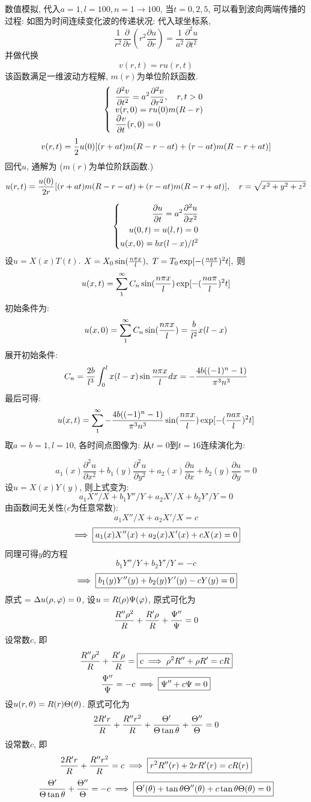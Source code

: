 \documentclass[UTF8,9pt]{ctexart}
\begin{document}
数值模拟, 代入$a=1, l=100, n=1\rightarrow100$, 当$t=0,2,5$, 可以看到波向两端传播的过程:
如图为时间连续变化波的传递状况:
\newpage
{}
代入球坐标系, 
$$ 
\frac{1}{r^{2}} \frac{\partial}{\partial r}(r^{2} \frac{\partial u}{\partial r})=\frac{1}{a^{2}} \frac{\partial^{2} u}{\partial t^{2}}
 $$
 并做代换
 $$ 
v(r, t)=r u(r, t)
 $$
该函数满足一维波动方程解, $m(r)$为单位阶跃函数. 
$$ 
\left\{\begin{array}{l}
{\displaystyle\frac{\partial^{2} v}{\partial t^{2}}=a^{2} \frac{\partial^{2} v}{\partial r^{2}}, \quad r, t>0} \\ 
{v(r, 0)=ru(0)m(R-r)} \\ 
{\displaystyle \frac{\partial^{} v}{\partial t^{}}(r,0)=0}
\end{array}\right.
 $$
$$v(r,t) = \frac{1}{2}u(0)[(r+at)m(R-r-at)+(r-at)m(R-r+at)]$$
回代$u$, 通解为 ($m(r)$为单位阶跃函数.)
$$ 
u(r,t) = \frac{u(0)}{2r}[(r+at)m(R-r-at)+(r-at)m(R-r+at)],\quad r=\sqrt{x^2+y^2+z^2}
 $$



 \newpage
{}
$$\left\{\begin{aligned}  
    \displaystyle\frac{\partial u}{\partial t}=a^{2} \frac{\partial^{2} u}{\partial x^{2}}\\
    u(0,t) = u(l,t) = 0\\
    u(x,0) = bx(l-x)/l^2\\
 \end{aligned}\right.$$
设$u=X(x)T(t)$. $X=X_0\sin(\f{n\pi x}{l}),\ T=T_0\exp[-(\f{na\pi}{l})^2t],\ $则
$$ u(x,t) = \sum_1^{\infty} C_n \sin(\frac{n\pi x}{l})\exp[-(\frac{na\pi}{l})^2t]$$ 
初始条件为: 
$$u(x,0) = \sum_1^{\infty} C_n \sin(\frac{n\pi x}{l}) = \frac{b}{l^2}x(l-x)$$ 
展开初始条件: 
$$ 
C_{n}=\frac{2b}{l^3} \int_{0}^{l} x(l-x) \sin \frac{n \pi x}{l} d x = -\frac{4b ((-1)^n-1)}{\pi ^3 n^3}
 $$
最后可得: 
$$u(x,t) =  \sum_1^{\infty} -\frac{4b ((-1)^n-1)}{\pi ^3 n^3} \sin(\frac{n\pi x}{l})\exp[-(\frac{na\pi}{l})^2t]$$ 
取$a=b=1,l=10$, 各时间点图像为:
从$t=0$到$t=16$连续演化为:

\newpage
{}
$$ 
a_{1}(x) \frac{\partial^{2} u}{\partial x^{2}}+b_{1}(y) \frac{\partial^{2} u}{\partial y^{2}}+a_{2}(x) \frac{\partial u}{\partial x}+b_{2}(y) \frac{\partial u}{\partial y}=0
 $$
设$u=X(x)Y(y)$, 则上式变为:
$$a_1X''/X+b_1Y''/Y+a_2X'/X+b_2Y'/Y=0$$
由函数间无关性($c$为任意常数): 
$$a_1X''/X+a_2X'/X=c$$
$$\implies \boxed{a_1(x)X''(x)+a_2(x)X'(x)+cX(x)=0}$$
同理可得$y$的方程
$$b_1Y''/Y+b_2Y'/Y=-c$$
$$\implies \boxed{b_1(y)Y''(y)+b_2(y)Y'(y) - cY(y)=0}$$
原式 = $\Delta u(\rho,\varphi)=0$, 设$u = R(\rho)\Psi (\varphi)$, 原式可化为
$$\frac{R''\rho^2}{R}+\frac{R'\rho}{R}+\frac{\Psi ''}{\Psi}=0$$
设常数$c$, 即
$$\frac{R''\rho^2}{R}+\frac{R'\rho}{R} = \boxed{c \implies \rho^2 R''+\rho R'=cR}$$
$$\frac{\Psi ''}{\Psi}=-c \implies \boxed{\Psi ''+c\Psi =0}$$
设$u(r,\theta) = R(r)\Theta(\theta)$. 原式可化为
$$\frac{2R'r}{R}+\frac{R''r^2}{R}+\frac{\Theta'}{\Theta \tan\theta}+\frac{\Theta''}{\Theta}=0$$
设常数$c$, 即
$$\frac{2R'r}{R}+\frac{R''r^2}{R} = c \implies \boxed{ r^2R''(r)+2rR'(r)=cR(r)}$$
$$\frac{\Theta'}{\Theta \tan\theta}+\frac{\Theta''}{\Theta}=-c \implies \boxed{\Theta'(\theta)+\tan\theta\Theta''(\theta)+c\tan\theta\Theta(\theta)=0}$$
\end{document}
